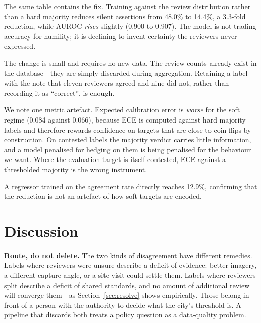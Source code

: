 \documentclass[sigconf]{acmart}
\begin{document}
The same table contains the fix. Training against the review distribution rather
than a hard majority reduces silent assertions from 48.0\% to 14.4\%, a
3.3-fold reduction, while AUROC \emph{rises} slightly (0.900 to 0.907). The
model is not trading accuracy for humility; it is declining to invent certainty
the reviewers never expressed.

The change is small and requires no new data. The review counts already exist in
the database---they are simply discarded during aggregation. Retaining a label
with the note that eleven reviewers agreed and nine did not, rather than
recording it as ``correct'', is enough.

We note one metric artefact. Expected calibration error is \emph{worse} for the
soft regime (0.084 against 0.066), because ECE is computed against hard majority
labels and therefore rewards confidence on targets that are close to coin flips
by construction. On contested labels the majority verdict carries little
information, and a model penalised for hedging on them is being penalised for
the behaviour we want. Where the evaluation target is itself contested, ECE
against a thresholded majority is the wrong instrument.

A regressor trained on the agreement rate directly reaches 12.9\%, confirming
that the reduction is not an artefact of how soft targets are encoded.

\section{Discussion}
\label{sec:discussion}

\textbf{Route, do not delete.} The two kinds of disagreement have different
remedies. Labels where reviewers were unsure describe a deficit of evidence:
better imagery, a different capture angle, or a site visit could settle them.
Labels where reviewers split describe a deficit of shared standards, and no
amount of additional review will converge them---as Section~\ref{sec:resolve}
shows empirically. Those belong in front of a person with the authority to
decide what the city's threshold is. A pipeline that discards both treats a
policy question as a data-quality problem.
\end{document}
